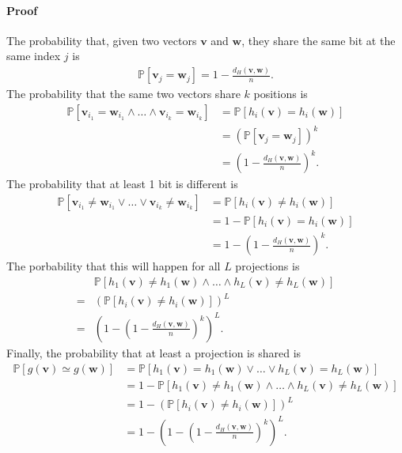 \begin{enumerate}
  \paragraph{Proof} The probability that, given two vectors $\textbf{v}$ and
  $\textbf{w}$, they share the same bit at the same index $j$ is
  \begin{align*}
    \mathbb{P}[\textbf{v}_j = \textbf{w}_j] = 1 - \frac{d_H(\textbf{v},
    \textbf{w})}{n}.
  \end{align*}
  The probability that the same two vectors share $k$ positions is
  \begin{align*}
    \mathbb{P}[\textbf{v}_{i_1} = \textbf{w}_{i_1} \wedge \dots \wedge
    \textbf{v}_{i_k} = \textbf{w}_{i_k}]
    &= \mathbb{P}[h_i(\textbf{v}) = h_i(\textbf{w})] \\
    &= \left( \mathbb{P}[\textbf{v}_j = \textbf{w}_j] \right)^k \\
    &= \left( 1 - \frac{d_H(\textbf{v}, \textbf{w})}{n} \right)^k.
  \end{align*}
  The probability that at least 1 bit is different is
  \begin{align*}
    \mathbb{P}[\textbf{v}_{i_1} \neq \textbf{w}_{i_1} \vee \dots \vee
    \textbf{v}_{i_k} \neq \textbf{w}_{i_k}]
    &= \mathbb{P}[h_i(\textbf{v}) \neq h_i(\textbf{w})] \\
    &= 1 - \mathbb{P}[h_i(\textbf{v}) = h_i(\textbf{w})] \\
    &= 1 - \left( 1 - \frac{d_H(\textbf{v}, \textbf{w})}{n} \right)^k.
  \end{align*}
  The porbability that this will happen for all $L$ projections is
  \begin{align*}
    &\mathbb{P}[h_1(\textbf{v}) \neq h_1(\textbf{w}) \wedge \dots \wedge
    h_L(\textbf{v}) \neq h_L(\textbf{w})] \\ = &\left(
    \mathbb{P}[h_i(\textbf{v}) \neq h_i(\textbf{w})] \right)^L \\ = &\left( 1 -
    \left( 1 - \frac{d_H(\textbf{v}, \textbf{w})}{n} \right)^k \right)^L.
  \end{align*}
  Finally, the probability that at least a projection is shared is
  \begin{align*}
    \mathbb{P}[g(\textbf{v}) \simeq g(\textbf{w})] &=
    \mathbb{P}[h_1(\textbf{v}) = h_1(\textbf{w}) \vee \dots \vee
    h_L(\textbf{v}) = h_L(\textbf{w})] \\ &= 1 -\mathbb{P}[h_1(\textbf{v}) \neq
    h_1(\textbf{w}) \wedge \dots \wedge h_L(\textbf{v}) \neq h_L(\textbf{w})] \\
    &= 1 - \left(\mathbb{P}[h_i(\textbf{v}) \neq h_i(\textbf{w})] \right)^L \\
    &= 1 - \left( 1 -\left( 1 - \frac{d_H(\textbf{v}, \textbf{w})}{n} \right)^k
    \right)^L.
  \end{align*}


\end{enumerate}
